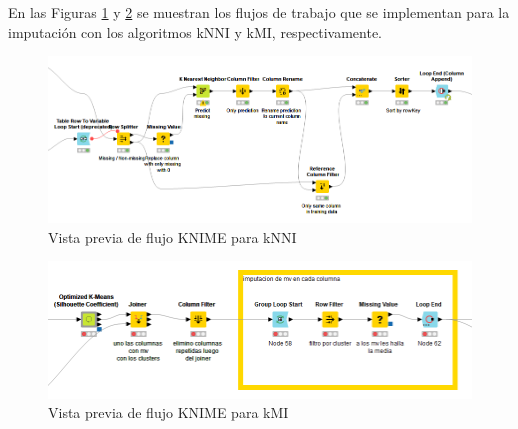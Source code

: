  En las Figuras \ref{fig:flujo-knni} y \ref{fig:flujo-kmi} se muestran los flujos de trabajo que se implementan para la imputación con los algoritmos kNNI y kMI, respectivamente.
 
 \begin{figure}[H]
 	\centering
 	\includegraphics[width=0.9\linewidth]{"figuras/capi 2/preprocesado/flujo-knni"}
 	\caption{Vista previa de flujo KNIME para kNNI}
 	\label{fig:flujo-knni}
 \end{figure}
 
  \begin{figure}[H]
 	\centering
 	\includegraphics[width=0.9\linewidth]{"figuras/capi 2/preprocesado/flujo-kmi"}
 	\caption{Vista previa de flujo KNIME para kMI}
 	\label{fig:flujo-kmi}
 \end{figure}
 
 

